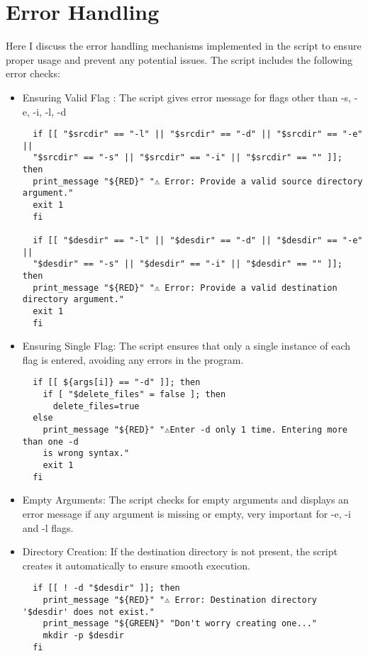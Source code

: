 \documentclass{article}
\begin{document}
\section{Error Handling}

Here I discuss the error handling mechanisms implemented in the script to ensure proper usage and prevent any potential issues. The script includes the following error checks:

\begin{itemize}
  \item Ensuring Valid Flag : The script gives error message for flags other than -s, -e, -i, -l, -d
  \begin{verbatim}
  if [[ "$srcdir" == "-l" || "$srcdir" == "-d" || "$srcdir" == "-e" ||
  "$srcdir" == "-s" || "$srcdir" == "-i" || "$srcdir" == "" ]]; then
  print_message "${RED}" "⚠️ Error: Provide a valid source directory argument."
  exit 1
  fi

  if [[ "$desdir" == "-l" || "$desdir" == "-d" || "$desdir" == "-e" ||
  "$desdir" == "-s" || "$desdir" == "-i" || "$desdir" == "" ]]; then
  print_message "${RED}" "⚠️ Error: Provide a valid destination directory argument."
  exit 1
  fi

  \end{verbatim}
  \item Ensuring Single Flag: The script ensures that only a single instance of each flag is entered, avoiding any errors in the program.
  \begin{verbatim}
  if [[ ${args[i]} == "-d" ]]; then
    if [ "$delete_files" = false ]; then
      delete_files=true
  else
    print_message "${RED}" "⚠️Enter -d only 1 time. Entering more than one -d
    is wrong syntax."
    exit 1
  fi
  \end{verbatim}
  \item Empty Arguments: The script checks for empty arguments and displays an error message if any argument is missing or empty, very important for -e, -i and -l flags.
  \item Directory Creation: If the destination directory is not present, the script creates it automatically to ensure smooth execution.
  \begin{verbatim}
  if [[ ! -d "$desdir" ]]; then
    print_message "${RED}" "⚠️ Error: Destination directory '$desdir' does not exist."
    print_message "${GREEN}" "Don't worry creating one..."
    mkdir -p $desdir
  fi
  \end{verbatim}
  
\end{itemize}
\end{document}
